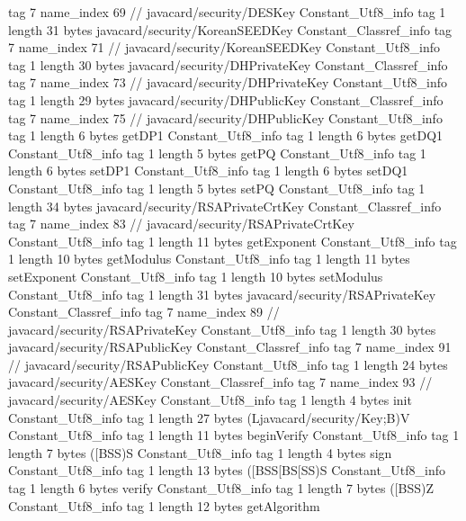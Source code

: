 {{{			tag	7
			name_index	69		// javacard/security/DESKey
		}
		Constant_Utf8_info {
			tag	1
			length	31
			bytes	javacard/security/KoreanSEEDKey
		}
		Constant_Classref_info {
			tag	7
			name_index	71		// javacard/security/KoreanSEEDKey
		}
		Constant_Utf8_info {
			tag	1
			length	30
			bytes	javacard/security/DHPrivateKey
		}
		Constant_Classref_info {
			tag	7
			name_index	73		// javacard/security/DHPrivateKey
		}
		Constant_Utf8_info {
			tag	1
			length	29
			bytes	javacard/security/DHPublicKey
		}
		Constant_Classref_info {
			tag	7
			name_index	75		// javacard/security/DHPublicKey
		}
		Constant_Utf8_info {
			tag	1
			length	6
			bytes	getDP1
		}
		Constant_Utf8_info {
			tag	1
			length	6
			bytes	getDQ1
		}
		Constant_Utf8_info {
			tag	1
			length	5
			bytes	getPQ
		}
		Constant_Utf8_info {
			tag	1
			length	6
			bytes	setDP1
		}
		Constant_Utf8_info {
			tag	1
			length	6
			bytes	setDQ1
		}
		Constant_Utf8_info {
			tag	1
			length	5
			bytes	setPQ
		}
		Constant_Utf8_info {
			tag	1
			length	34
			bytes	javacard/security/RSAPrivateCrtKey
		}
		Constant_Classref_info {
			tag	7
			name_index	83		// javacard/security/RSAPrivateCrtKey
		}
		Constant_Utf8_info {
			tag	1
			length	11
			bytes	getExponent
		}
		Constant_Utf8_info {
			tag	1
			length	10
			bytes	getModulus
		}
		Constant_Utf8_info {
			tag	1
			length	11
			bytes	setExponent
		}
		Constant_Utf8_info {
			tag	1
			length	10
			bytes	setModulus
		}
		Constant_Utf8_info {
			tag	1
			length	31
			bytes	javacard/security/RSAPrivateKey
		}
		Constant_Classref_info {
			tag	7
			name_index	89		// javacard/security/RSAPrivateKey
		}
		Constant_Utf8_info {
			tag	1
			length	30
			bytes	javacard/security/RSAPublicKey
		}
		Constant_Classref_info {
			tag	7
			name_index	91		// javacard/security/RSAPublicKey
		}
		Constant_Utf8_info {
			tag	1
			length	24
			bytes	javacard/security/AESKey
		}
		Constant_Classref_info {
			tag	7
			name_index	93		// javacard/security/AESKey
		}
		Constant_Utf8_info {
			tag	1
			length	4
			bytes	init
		}
		Constant_Utf8_info {
			tag	1
			length	27
			bytes	(Ljavacard/security/Key;B)V
		}
		Constant_Utf8_info {
			tag	1
			length	11
			bytes	beginVerify
		}
		Constant_Utf8_info {
			tag	1
			length	7
			bytes	([BSS)S
		}
		Constant_Utf8_info {
			tag	1
			length	4
			bytes	sign
		}
		Constant_Utf8_info {
			tag	1
			length	13
			bytes	([BSS[BS[SS)S
		}
		Constant_Utf8_info {
			tag	1
			length	6
			bytes	verify
		}
		Constant_Utf8_info {
			tag	1
			length	7
			bytes	([BSS)Z
		}
		Constant_Utf8_info {
			tag	1
			length	12
			bytes	getAlgorithm
		}
}}
